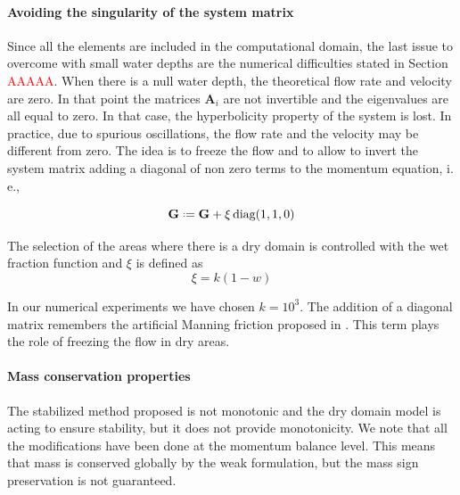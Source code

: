 

\paragraph{Avoiding the singularity of the system matrix}
Since all the elements are included in the computational domain, the last issue to overcome with small water depths are the numerical difficulties stated in Section \textcolor{red}{AAAAA}.
When there is a null water depth, the theoretical flow rate and velocity are zero. In that point the matrices $\mathbf{A}_i$ are not invertible and the eigenvalues are all equal to zero. In that case, the hyperbolicity property of the system is lost.
In practice, due to spurious oscillations, the flow rate and the velocity may be different from zero. The idea is to freeze the flow and to allow to invert the system matrix adding a diagonal of non zero terms to the momentum equation, i. e.,


\begin{equation}
\mathbf{G} \defeq \mathbf{G} + \xi\,\text{diag}(1, 1, 0)
\end{equation}


The selection of the areas where there is a dry domain is controlled with the wet fraction function and $\xi$ is defined as
\begin{equation}
\xi = k(1-w)
\end{equation}

In our numerical experiments we have chosen $k=10^3$.
The addition of a diagonal matrix remembers the artificial Manning friction proposed in \cite{heniche2000}. This term plays the role of freezing the flow in dry areas.


\paragraph{Mass conservation properties}
The stabilized method proposed is not monotonic and the dry domain model is acting to ensure stability, but it does not provide monotonicity. We note that all the modifications have been done at the momentum balance level. This means that mass is conserved globally by the weak formulation, but the mass sign preservation is not guaranteed.

